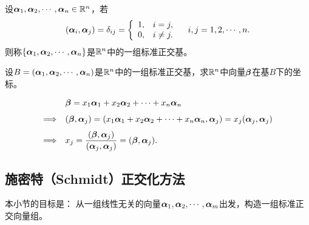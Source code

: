 \begin{frame}\ft{\subsecname}

\begin{dingyi}[标准正交基]
  设$\boldsymbol{\alpha}_1,\boldsymbol{\alpha}_2,\cdots,\boldsymbol{\alpha}_n\in \mathbb R^n$，若
  $$
  (\boldsymbol{\alpha}_i,\boldsymbol{\alpha}_j)=\delta_{ij}=\left\{
    \begin{array}{ll}
      1,& i=j,\\
      0,& i\ne j.
    \end{array}
  \right. \quad i,j=1,2,\cdots,n.
  $$
  则称$\{\boldsymbol{\alpha}_1,\boldsymbol{\alpha}_2,\cdots,\boldsymbol{\alpha}_n\}$是$\mathbb R^n$中的一组标准正交基。
\end{dingyi}

\end{frame}

\begin{frame}\ft{\subsecname}

\begin{li}
  设$B=(\boldsymbol{\alpha}_1,\boldsymbol{\alpha}_2,\cdots,\boldsymbol{\alpha}_n)$是$\mathbb R^n$中的一组标准正交基，求$\mathbb R^n$中向量$\boldsymbol{\beta}$在基$B$下的坐标。
\end{li}
\begin{jie}
$$
\begin{array}{rl}
  & \boldsymbol{\beta}=x_1\boldsymbol{\alpha}_1+x_2\boldsymbol{\alpha}_2+\cdots+x_n\boldsymbol{\alpha}_n\\[0.1in]
  \Longrightarrow&   (\boldsymbol{\beta},\boldsymbol{\alpha}_j)=(x_1\boldsymbol{\alpha}_1+x_2\boldsymbol{\alpha}_2+\cdots+x_n\boldsymbol{\alpha}_n,\boldsymbol{\alpha}_j)=x_j(\boldsymbol{\alpha}_j,\boldsymbol{\alpha}_j)\\[0.1in]
  \Longrightarrow& \displaystyle x_j =\frac{ (\boldsymbol{\beta},\boldsymbol{\alpha}_j)}{(\boldsymbol{\alpha}_j,\boldsymbol{\alpha}_j)} = (\boldsymbol{\beta},\boldsymbol{\alpha}_j).
\end{array}
$$
\end{jie}

\end{frame}

\subsection{施密特（Schmidt）正交化方法}

\begin{frame}\ft{\subsecname}
本小节的目标是： 从一组线性无关的向量$\boldsymbol{\alpha}_1,\boldsymbol{\alpha}_2,\cdots,\boldsymbol{\alpha}_m$出发，构造一组标准正交向量组。
\end{frame}


